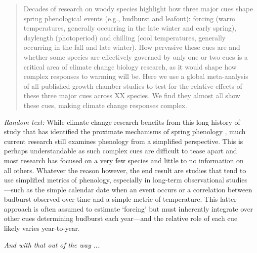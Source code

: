 \documentclass[11pt,letterpaper]{article}
\begin{document}
\begin{abstract}
Decades of research on woody species highlight how three major cues shape spring phenological events (e.g., budburst and leafout): forcing (warm temperatures, generally occurring in the late winter and early spring), daylength (photoperiod) and chilling (cool temperatures, generally occurring in the fall and late winter). How pervasive these cues are and whether some species are effectively governed by only one or two cues is a critical area of climate change biology research, as it would shape how complex responses to warming will be. Here we use a global meta-analysis of all published growth chamber studies to test for the relative effects of these three major cues across XX species. We find they almost all show these cues, making climate change responses complex. 
\end{abstract}

\emph{Random text:} While climate change research benefits from this long history of study that has identified the proximate mechanisms of spring phenology \citep{chuinearees}, much current research still examines phenology from a simplified perspective. This is perhaps understandable as such complex cues are difficult to tease apart and most research has focused on a very few species and little to no information on all others. Whatever the reason however, the end result are studies that tend to use simplified metrics of phenology, especially in long-term observational studies---such as the simple calendar date when an event occurs or a correlation between budburst observed over time and a simple metric of temperature. This latter approach is often assumed to estimate `forcing' but must inherently integrate over other cues determining budburst each year---and the relative role of each cue likely varies year-to-year. 

\emph{And with that out of the way ...}\\
\end{document}
